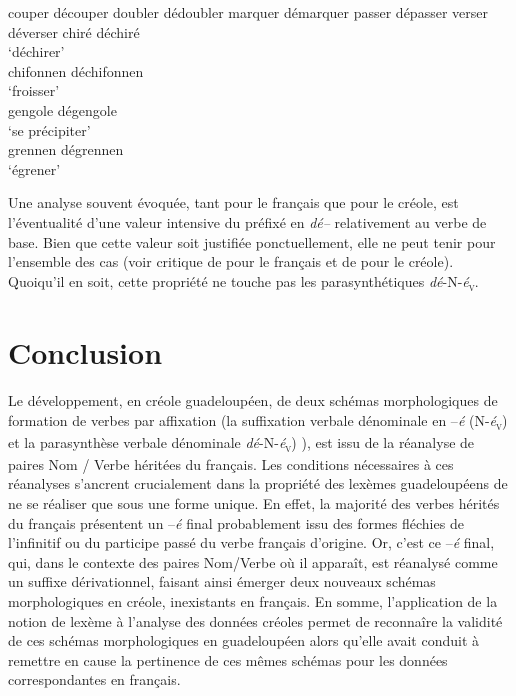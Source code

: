 \documentclass[output=paper]{langsci/langscibook}
\begin{document}
\ea \label{ex:VilloingDeglas:59}
      \ea couper \textrightarrow{~} découper
      \ex  doubler \textrightarrow{~} dédoubler
      \ex  marquer \textrightarrow{~} démarquer
      \ex passer \textrightarrow{~} dépasser
      \ex verser \textrightarrow{~} déverser
      \z
\ex \label{ex:VilloingDeglas:60}
      \ea chiré \textrightarrow{~} déchiré \\
      \glt `déchirer' \\
      \ex chifonnen \textrightarrow{~} déchifonnen \\
      \glt `froisser' \\
      \ex gengole \textrightarrow{~} dégengole \\
      \glt `se précipiter' \\
      \ex grennen \textrightarrow{~} dégrennen \\
      \glt `égrener' \\
      \z
\z

Une analyse souvent évoquée, tant pour le français que pour le créole,
est l'éventualité d'une valeur intensive du préfixé en \emph{dé--}
relativement au verbe de base. Bien que cette valeur soit justifiée
ponctuellement, elle ne peut tenir pour l'ensemble des cas (voir
critique de %
\citet[1779]{Jalenques2014} %
%
 pour le français et de %
\citet{DeGraff2001} %
%
 pour le créole). Quoiqu'il en soit, cette propriété ne touche
pas les parasynthétiques \emph{dé}-N-\emph{é}\textsubscript{\textsc{v}}.

\section{Conclusion }\label{section:VilloingDeglas:conclusion}
\largerpage
Le développement, en créole guadeloupéen, de deux schémas morphologiques
de formation de verbes par affixation (la suffixation verbale dénominale
en --\emph{é} (N-\emph{é}\textsubscript{\textsc{v}}) et la parasynthèse verbale
dénominale \emph{dé}-N-\emph{é}\textsubscript{\textsc{v}}) ), est issu de la réanalyse de
paires Nom / Verbe héritées du français. Les conditions nécessaires à
ces réanalyses s'ancrent crucialement dans la propriété des lexèmes
guadeloupéens de ne se réaliser que sous une forme unique. En effet, la
majorité des verbes hérités du français présentent un --\emph{é }final
probablement issu des formes fléchies de l'infinitif ou du participe
passé du verbe français d'origine. Or, c'est ce --\emph{é} final, qui,
dans le contexte des paires Nom/Verbe où il apparaît, est réanalysé
comme un suffixe dérivationnel, faisant ainsi émerger deux nouveaux
schémas morphologiques en créole, inexistants en français. En somme,
l'application de la notion de lexème à l'analyse des données créoles
permet de reconnaîre la validité de ces schémas morphologiques en
guadeloupéen alors qu'elle avait conduit à remettre en cause la
pertinence de ces mêmes schémas pour les données correspondantes en
français.
\end{document}
